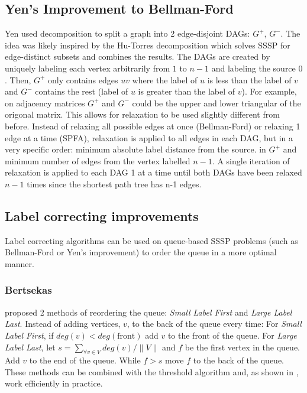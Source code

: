 \documentclass{article}
\begin{document}
\subsection{Yen's Improvement to Bellman-Ford}
Yen \cite{Yen Decomposition} used decomposition to split a graph into 2 edge-disjoint DAGs: $G^+$, $G^-$. The idea was likely inspired by the Hu-Torres decomposition \cite{Hu, Hu Torres} which solves SSSP for edge-distinct subsets and combines the results. The DAGs are created by uniquely labeling each vertex arbitrarily from $1$ to $n-1$ and labeling the source $0$. Then, $G^+$ only contains edges $uv$ where the label of $u$ is less than the label of $v$ and $G^-$ contains the rest (label of $u$ is greater than the label of $v$). For example, on adjacency matrices $G^+$ and $G^-$ could be the upper and lower triangular of the origonal matrix. This allows for relaxation to be used slightly different from before.  Instead of relaxing all possible edges at once (Bellman-Ford) or relaxing 1 edge at a time (SPFA), relaxation is applied to all edges in each DAG, but in a very specific order: minimum absolute label distance from the source. in $G^+$ and minimum number of edges from the vertex labelled $n-1$. A single iteration of relaxation is applied to each DAG 1 at a time until both DAGs have been relaxed $n-1$ times since the shortest path tree has n-1 edges.
\subsection{Label correcting improvements}
Label correcting algorithms can be used on queue-based SSSP problems (such as Bellman-Ford or Yen's improvement) to order the queue in a more optimal manner.

\subsubsection{Bertsekas}
\cite{Bertsekas1, Bertsekas2} proposed 2 methods of reordering the queue: \textit{Small Label First} and \textit{Large Label Last}. Instead of adding vertices, $v$, to the back of the queue every time:
For \textit{Small Label First}, if $deg(v) < deg(\text{front})$ add $v$ to the front of the queue.
For \textit{Large Label Last}, let $s = \sum_{\forall v \in V}deg(v) /\|V\|$ and $f$ be the first vertex in the queue. Add $v$ to the end of the queue. While $f > s$ move $f$ to the back of the queue.\\
These methods can be combined with the threshold algorithm and, as shown in \cite{Bertsekas1}, work efficiently in practice.
\end{document}
